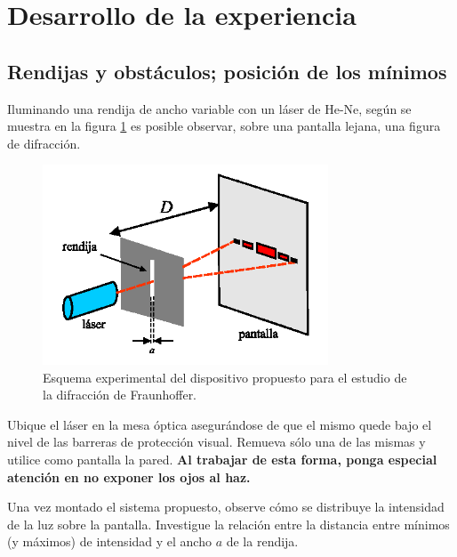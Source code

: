 \documentclass[laboratorio]{guia}
\begin{document}
\maketitle


\section{Desarrollo de la experiencia}

\subsection{Rendijas y obstáculos; posición de los mínimos}

Iluminando una rendija de ancho variable con un láser de He-Ne, según se muestra en la figura \ref{fig:1} es posible observar, sobre una pantalla lejana, una figura de difracción.

\begin{figure}[ht]
  \centering
  \includegraphics[width=8.5cm]{LG10--000.png}
  \caption{Esquema experimental del dispositivo propuesto para el estudio de la difracción de Fraunhoffer.}
  \label{fig:1}
\end{figure}

Ubique el láser en la mesa óptica asegurándose de que el mismo quede bajo el nivel de las barreras de protección visual.
Remueva sólo una de las mismas y utilice como pantalla la pared.
\textbf{Al trabajar de esta forma, ponga especial atención en no exponer los ojos al haz.} 

Una vez montado el sistema propuesto, observe cómo se distribuye la intensidad de la luz sobre la pantalla.
Investigue la relación entre la distancia entre mínimos (y máximos) de intensidad y el
ancho \(a\) de la rendija. 
\end{document}
